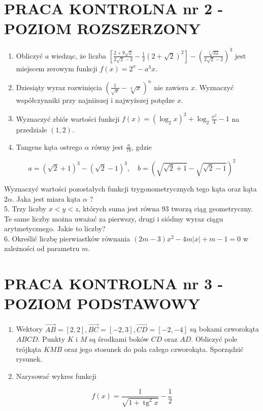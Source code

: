 \documentclass[10pt]{article}
\begin{document}
\section*{PRACA KONTROLNA nr 2 - POZIOM ROZSZERZONY}
\begin{enumerate}
  \item Obliczyć $a$ wiedząc, że liczba $\left[\frac{2+9 \sqrt{2}}{2 \sqrt{2}-2}-\frac{1}{2}(2+\sqrt{2})^{2}\right]-\left(\frac{\sqrt[6]{32}}{2 \sqrt{2}-2}\right)^{3}$ jest miejscem zerowym funkcji $f(x)=2^{x}-a^{3} x$.
  \item Dziesiąty wyraz rozwinięcia $\left(\frac{1}{\sqrt{x}}-\sqrt[3]{x}\right)^{n}$ nie zawiera $x$. Wyznaczyć współczynniki przy najniższej i najwyższej potędze $x$.
  \item Wyznaczyć zbiór wartości funkcji $f(x)=\left(\log _{2} x\right)^{3}+\log _{2} \frac{x^{2}}{4}-1$ na przedziale $(1,2)$.
  \item Tangens kąta ostrego $\alpha$ równy jest $\frac{a}{7 b}$, gdzie
\end{enumerate}

$$
a=(\sqrt{2}+1)^{3}-(\sqrt{2}-1)^{3}, \quad b=(\sqrt{\sqrt{2}+1}-\sqrt{\sqrt{2}-1})^{2}
$$

Wyznaczyć wartości pozostałych funkcji trygonometrycznych tego kąta oraz kąta $2 \alpha$. Jaka jest miara kąta $\alpha$ ?\\
5. Trzy liczby $x<y<z$, których suma jest równa 93 tworzą ciąg geometryczny. Te same liczby można uważać za pierwszy, drugi i siódmy wyraz ciągu arytmetycznego. Jakie to liczby?\\
6. Określić liczbę pierwiastków równania $(2 m-3) x^{2}-4 m|x|+m-1=0$ w zależności od parametru $m$.

\section*{PRACA KONTROLNA nr $\mathbf{3}$ - POZIOM PODSTAWOWY}
\begin{enumerate}
  \item Wektory $\overrightarrow{A B}=[2,2], \overrightarrow{B C}=[-2,3], \overrightarrow{C D}=[-2,-4]$ są bokami czworokąta $A B C D$. Punkty $K$ i $M$ są środkami boków $C D$ oraz $A D$. Obliczyć pole trójkąta $K M B$ oraz jego stosunek do pola całego czworokąta. Sporządzić rysunek.
  \item Narysować wykres funkcji
\end{enumerate}

$$
f(x)=\frac{1}{\sqrt{1+\operatorname{tg}^{2} x}}-\frac{1}{2}
$$
\end{document}
